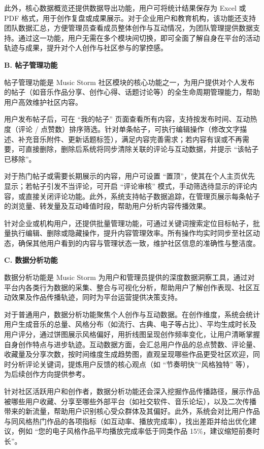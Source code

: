 \documentclass{base}
\numberwithin{figure}{section} %
\begin{document}
此外，核心数据概览还提供数据导出功能，用户可将统计结果保存为 Excel 或 PDF 格式，用于创作复盘或成果展示。对于企业用户和教育机构，该功能还支持团队数据汇总，方便管理员查看成员整体创作与互动情况，为团队管理提供数据支持。通过这一功能，用户无需在多个模块间切换，即可全面了解自身在平台的活动轨迹与成果，提升对个人创作与社区参与的掌控感。

\textbf{B. 帖子管理功能}

帖子管理功能是 Music Storm 社区模块的核心功能之一，为用户提供对个人发布的帖子（如音乐作品分享、创作心得、话题讨论等）的全生命周期管理能力，帮助用户高效维护社区内容。

用户发布帖子后，可在 “我的帖子” 页面查看所有内容，支持按发布时间、互动热度（评论 / 点赞数）排序筛选。针对单条帖子，可执行编辑操作（修改文字描述、补充音乐附件、更新话题标签），满足内容完善需求；若内容有误或不再需要，可直接删除，删除后系统将同步清除关联的评论与互动数据，并提示 “该帖子已移除”。

对于热门帖子或需要长期展示的内容，用户可设置 “置顶”，使其在个人主页优先显示；若帖子引发不当评论，可开启 “评论审核” 模式，手动筛选待显示的评论内容，或直接关闭评论功能。此外，系统支持帖子数据追踪，在管理页展示每条帖子的浏览量、转发量及互动峰值时段，帮助用户分析内容传播效果。

针对企业或机构用户，还提供批量管理功能，可通过关键词搜索定位目标帖子，批量执行编辑、删除或隐藏操作，提升内容管理效率。所有操作均实时同步至社区动态，确保其他用户看到的内容与管理状态一致，维护社区信息的准确性与整洁度。

\textbf{C. 数据分析功能}

数据分析功能是 Music Storm 为用户和管理员提供的深度数据洞察工具，通过对平台内各类行为数据的采集、整合与可视化分析，帮助用户了解创作表现、社区互动效果及作品传播轨迹，同时为平台运营提供决策支持。​

对于普通用户，数据分析功能聚焦个人创作与互动数据。在创作维度，系统会统计用户生成音乐的总量、风格分布（如流行、古典、电子等占比）、平均生成时长及用户评分，通过饼图展示风格偏好，用折线图呈现创作频率变化，让用户清晰掌握自身创作特点与进步轨迹。互动数据方面，会汇总用户作品的总点赞数、评论量、收藏量及分享次数，按时间维度生成趋势图，直观呈现哪些作品更受社区欢迎，同时分析评论关键词，提炼用户反馈的核心观点（如 “节奏明快”“风格独特” 等），为后续创作方向提供参考。

针对社区活跃用户和创作者，数据分析功能还会深入挖掘作品传播路径，展示作品被哪些用户收藏、分享至哪些外部平台（如社交软件、音乐论坛），以及二次传播带来的新流量，帮助用户识别核心受众群体及其偏好。此外，系统会对比用户作品与同风格热门作品的各项指标（如互动率、播放完成率），找出差距并给出优化建议，例如 “您的电子风格作品平均播放完成率低于同类作品 15\%，建议缩短前奏时长”。​
\end{document}
